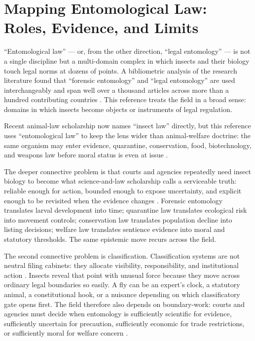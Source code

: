 \documentclass[
  english,
]{article}
\begin{document}
\newpage

\section{Mapping Entomological Law: Roles, Evidence, and
Limits}\label{sec:introduction}

``Entomological law'' --- or, from the other direction, ``legal
entomology'' --- is not a single discipline but a multi-domain complex
in which insects and their biology touch legal norms at dozens of
points. A bibliometric analysis of the research literature found that
``forensic entomology'' and ``legal entomology'' are used
interchangeably and span well over a thousand articles across more than
a hundred contributing countries \citep{magana2019bibliometric}. This
reference treats the field in a broad sense: domains in which insects
become objects or instruments of legal regulation.

Recent animal-law scholarship now names ``insect law'' directly, but
this reference uses ``entomological law'' to keep the lens wider than
animal-welfare doctrine: the same organism may enter evidence,
quarantine, conservation, food, biotechnology, and weapons law before
moral status is even at issue \citep{reddy2025insect_law}.

The deeper connective problem is that courts and agencies repeatedly
need insect biology to become what science-and-law scholarship calls a
serviceable truth: reliable enough for action, bounded enough to expose
uncertainty, and explicit enough to be revisited when the evidence
changes \citep{jasanoff2015serviceable}. Forensic entomology translates
larval development into time; quarantine law translates ecological risk
into movement controls; conservation law translates population decline
into listing decisions; welfare law translates sentience evidence into
moral and statutory thresholds. The same epistemic move recurs across
the field.

The second connective problem is classification. Classification systems
are not neutral filing cabinets: they allocate visibility,
responsibility, and institutional action \citep{bowker1999sorting}.
Insects reveal that point with unusual force because they move across
ordinary legal boundaries so easily. A fly can be an expert's clock, a
statutory animal, a constitutional hook, or a nuisance depending on
which classificatory gate opens first. The field therefore also depends
on boundary-work: courts and agencies must decide when entomology is
sufficiently scientific for evidence, sufficiently uncertain for
precaution, sufficiently economic for trade restrictions, or
sufficiently moral for welfare concern
\citep{gieryn1983boundary_work, jasanoff2004states_of_knowledge}.
\end{document}
